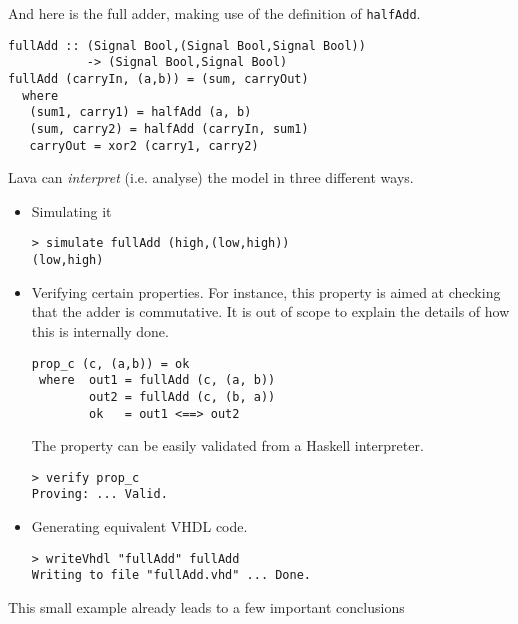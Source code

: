 And here is the full adder, making use of the definition of \texttt{halfAdd}.

\begin{lstlisting}
fullAdd :: (Signal Bool,(Signal Bool,Signal Bool)) 
           -> (Signal Bool,Signal Bool)
fullAdd (carryIn, (a,b)) = (sum, carryOut)
  where
   (sum1, carry1) = halfAdd (a, b)
   (sum, carry2) = halfAdd (carryIn, sum1)
   carryOut = xor2 (carry1, carry2)
\end{lstlisting}

Lava can \textit{interpret} (i.e. analyse) the model in three
different ways.

\begin{itemize}
\item Simulating it

\begin{verbatim}
> simulate fullAdd (high,(low,high))
(low,high)
\end{verbatim}

\item Verifying certain properties. For instance, this property is
  aimed at checking that the adder is commutative. It is out of scope
  to explain the details of how this is internally done.
  
\begin{lstlisting}
prop_c (c, (a,b)) = ok
 where  out1 = fullAdd (c, (a, b))
        out2 = fullAdd (c, (b, a))
        ok   = out1 <==> out2
\end{lstlisting}
The property can be easily validated from a Haskell interpreter.
\begin{verbatim}
> verify prop_c
Proving: ... Valid.
\end{verbatim}

\item Generating equivalent VHDL code.

\begin{verbatim}
> writeVhdl "fullAdd" fullAdd
Writing to file "fullAdd.vhd" ... Done.
\end{verbatim}

\end{itemize}

This small example already leads to a few important conclusions

